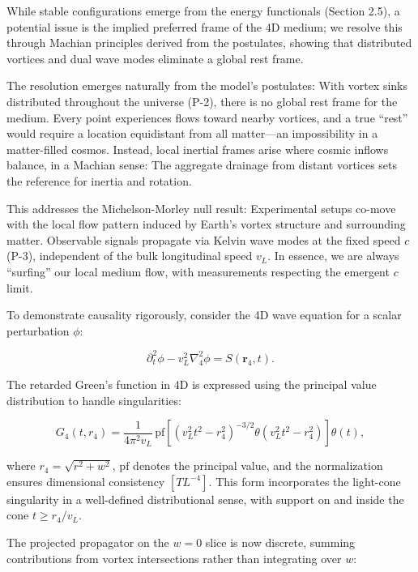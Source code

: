 While stable configurations emerge from the energy functionals (Section 2.5), a potential issue is the implied preferred frame of the 4D medium; we resolve this through Machian principles derived from the postulates, showing that distributed vortices and dual wave modes eliminate a global rest frame.

The resolution emerges naturally from the model's postulates: With vortex sinks distributed throughout the universe (P-2), there is no global rest frame for the medium. Every point experiences flows toward nearby vortices, and a true ``rest'' would require a location equidistant from all matter---an impossibility in a matter-filled cosmos. Instead, local inertial frames arise where cosmic inflows balance, in a Machian sense: The aggregate drainage from distant vortices sets the reference for inertia and rotation.

This addresses the Michelson-Morley null result: Experimental setups co-move with the local flow pattern induced by Earth's vortex structure and surrounding matter. Observable signals propagate via Kelvin wave modes at the fixed speed $c$ (P-3), independent of the bulk longitudinal speed $v_L$. In essence, we are always ``surfing'' our local medium flow, with measurements respecting the emergent $c$ limit.

To demonstrate causality rigorously, consider the 4D wave equation for a scalar perturbation $\phi$:

\begin{equation}
\partial_t^2 \phi - v_L^2 \nabla_4^2 \phi = S(\mathbf{r}_4, t).
\end{equation}

The retarded Green's function in 4D is expressed using the principal value distribution to handle singularities:

\begin{equation}
G_4(t, r_4) = \frac{1}{4 \pi^2 v_L} \, \text{pf} \left[ (v_L^2 t^2 - r_4^2)^{-3/2} \theta(v_L^2 t^2 - r_4^2) \right] \theta(t),
\end{equation}

where $r_4 = \sqrt{r^2 + w^2}$, $\text{pf}$ denotes the principal value, and the normalization ensures dimensional consistency $[T L^{-4}]$. This form incorporates the light-cone singularity in a well-defined distributional sense, with support on and inside the cone $t \geq r_4 / v_L$.

The projected propagator on the $w=0$ slice is now discrete, summing contributions from vortex intersections rather than integrating over $w$:

